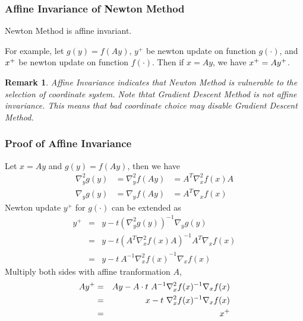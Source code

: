 \documentclass{beamer}
\newcommand{\be}{\begin{eqnarray}}
\newcommand{\ee}{\end{eqnarray}}
\newtheorem{remark}{Remark}
\begin{document}
\newcommand{\yp}{\ensuremath{y^{+}}}
\newcommand{\gradient}[3]{\ensuremath{\nabla_{#1} #2 (#3)}}
\newcommand{\hessian}[3]{\ensuremath{\nabla^2_{#1} #2 (#3)}}
\newcommand{\inv}{^{-1}}
\begin{frame}
\frametitle{Affine Invariance of Newton Method}
\begin{lemma}
    Newton Method is affine invariant. 
\end{lemma}

For example, let $g(y) = f(Ay)$, $\yp$ be newton update on function
$g(\cdot)$, and 
$x^{+}$ be newton update on function $f(\cdot)$. 
Then if $x=Ay$, we have $\xp = A\yp$.

\begin{remark}
    Affine Invariance indicates that Newton Method is vulnerable to the
    selection of coordinate system. 
    Note thtat Gradient Descent Method is not affine invariance. This means
    that bad coordinate choice may disable Gradient Descent Method.
\end{remark}
\end{frame}

\begin{frame}
\frametitle{Proof of Affine Invariance}
    Let $x = Ay$ and $g(y) = f(Ay)$, then we have
    \be
    \hessian{y}{g}{y} &= \hessian{y}{f}{Ay} &= A^T \hessian{x}{f}{x} A \\
    \gradient{y}{g}{y} &= \gradient{y}{f}{Ay} &= A^T \gradient{x}{f}{x}
    \ee
    Newton update $\yp$ for $g(\cdot)$ can be extended as
    \be
    \yp &=& y - t(\hessian{y}{g}{y})\inv \gradient{y}{g}{y} \\
    &=& y - t(A^T \hessian{x}{f}{x} A)\inv A^T \gradient{x}{f}{x} \\
    &=& y - t\ A\inv \hessian{x}{f}{x}\inv \gradient{x}{f}{x}
    \ee
    Multiply both sides with affine tranformation $A$, 
    \be
    A\yp &=& Ay - A \cdot t\ A\inv \hessian{x}{f}{x}\inv \gradient{x}{f}{x} \\
    &=& x - t\ \hessian{x}{f}{x}\inv \gradient{x}{f}{x} \\
    &=& \xp
    \ee
\end{frame}
\end{document}
